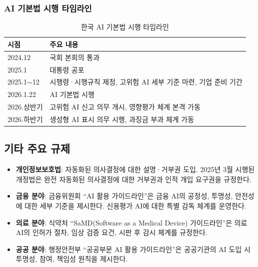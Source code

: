 \subsubsection{AI 기본법 시행 타임라인}

\begin{table}[htbp]
\centering
\caption{한국 AI 기본법 시행 타임라인}
\label{tab:korea_ai_basic_timeline}
\begin{tabularx}{\textwidth}{p{2.5cm}X}
\toprule
\textbf{시점} & \textbf{주요 내용} \\
\midrule
2024.12 & 국회 본회의 통과 \\
2025.1 & 대통령 공포 \\
2025.1$\sim$12 & 시행령·시행규칙 제정, 고위험 AI 세부 기준 마련, 기업 준비 기간 \\
2026.1.22 & AI 기본법 시행 \\
2026.상반기 & 고위험 AI 신고 의무 개시, 영향평가 체계 본격 가동 \\
2026.하반기 & 생성형 AI 표시 의무 시행, 과징금 부과 체계 가동 \\
\bottomrule
\end{tabularx}
\end{table}

\subsection{기타 주요 규제}
\begin{itemize}
 \item \textbf{개인정보보호법}: 자동화된 의사결정에 대한 설명·거부권 도입. 2025년 3월 시행된 개정법은 완전 자동화된 의사결정에 대한 거부권과 인적 개입 요구권을 규정한다.
 \item \textbf{금융 분야}: 금융위원회 ``AI 활용 가이드라인''\cite{fsc2024ai}은 금융 AI의 공정성, 투명성, 안전성에 대한 세부 기준을 제시한다. 신용평가 AI에 대한 특별 감독 체계를 운영한다.
 \item \textbf{의료 분야}: 식약처 ``SaMD(Software as a Medical Device) 가이드라인''은 의료 AI의 인허가 절차, 임상 검증 요건, 시판 후 감시 체계를 규정한다.
 \item \textbf{공공 분야}: 행정안전부 ``공공부문 AI 활용 가이드라인''\cite{nia2024quality}은 공공기관의 AI 도입 시 투명성, 참여, 책임성 원칙을 제시한다.
\end{itemize}

